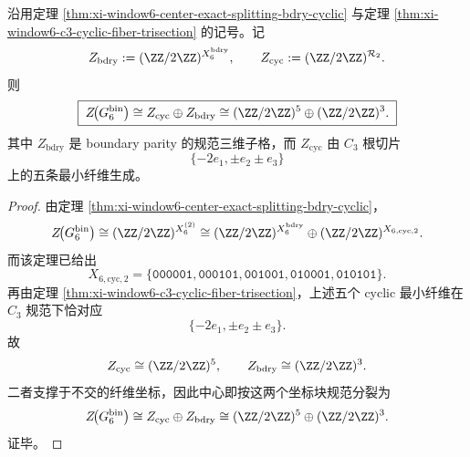 \begin{theorem}\label{thm:xi-window6-c3-center-five-plus-three-splitting}
沿用定理 \ref{thm:xi-window6-center-exact-splitting-bdry-cyclic} 与定理 \ref{thm:xi-window6-c3-cyclic-fiber-trisection} 的记号。记
\[
Z_{\mathrm{bdry}}:=(\ZZ/2\ZZ)^{X_6^{\mathrm{bdry}}},
\qquad
Z_{\mathrm{cyc}}:=(\ZZ/2\ZZ)^{\mathcal R_2}.
\]
则
\[
\boxed{\;
Z\!\bigl(G_6^{\mathrm{bin}}\bigr)
\cong
Z_{\mathrm{cyc}}\oplus Z_{\mathrm{bdry}}
\cong
(\ZZ/2\ZZ)^5\oplus(\ZZ/2\ZZ)^3.\;}
\]
其中 \(Z_{\mathrm{bdry}}\) 是 boundary parity 的规范三维子格，而 \(Z_{\mathrm{cyc}}\) 由 \(C_3\) 根切片
\[
\{-2e_1,\pm e_2\pm e_3\}
\]
上的五条最小纤维生成。
\end{theorem}
\begin{proof}
由定理 \ref{thm:xi-window6-center-exact-splitting-bdry-cyclic}，
\[
Z\!\bigl(G_6^{\mathrm{bin}}\bigr)
\cong
(\ZZ/2\ZZ)^{X_6^{(2)}}
\cong
(\ZZ/2\ZZ)^{X_6^{\mathrm{bdry}}}
\oplus
(\ZZ/2\ZZ)^{X_{6,\mathrm{cyc},2}}.
\]
而该定理已给出
\[
X_{6,\mathrm{cyc},2}
=
\{\texttt{000001},\texttt{000101},\texttt{001001},\texttt{010001},\texttt{010101}\}.
\]
再由定理 \ref{thm:xi-window6-c3-cyclic-fiber-trisection}，上述五个 cyclic 最小纤维在 \(C_3\) 规范下恰对应
\[
\{-2e_1,\pm e_2\pm e_3\}.
\]
故
\[
Z_{\mathrm{cyc}}\cong (\ZZ/2\ZZ)^5,
\qquad
Z_{\mathrm{bdry}}\cong (\ZZ/2\ZZ)^3.
\]
二者支撑于不交的纤维坐标，因此中心即按这两个坐标块规范分裂为
\[
Z\!\bigl(G_6^{\mathrm{bin}}\bigr)\cong Z_{\mathrm{cyc}}\oplus Z_{\mathrm{bdry}}
\cong
(\ZZ/2\ZZ)^5\oplus(\ZZ/2\ZZ)^3.
\]
证毕。
\end{proof}

